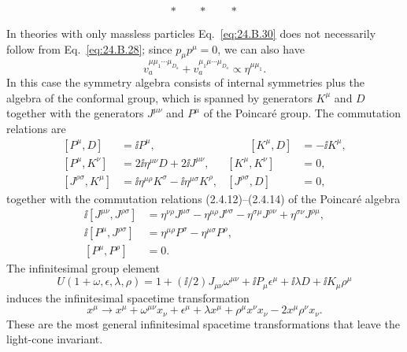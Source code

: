 \[
 *\qquad *\qquad *
\]

In theories with only massless particles Eq.~\eqref{eq:24.B.30} does not
necessarily follow from Eq.~\eqref{eq:24.B.28}; since $p_\mu p^\mu=0$, we can
also have
\begin{equation}
 v_a^{\mu\mu_1\cdots\mu_{D_a}}
 +v_a^{\mu_1\mu\cdots\mu_{D_a}}
 \propto\eta^{\mu\mu_1}.
\tag{24.B.33}\label{eq:24.B.33}
\end{equation}
In this case the symmetry algebra consists of internal symmetries plus the
algebra of the conformal group, which is spanned by generators $K^\mu$ and $D$
together with the generators $J^{\mu\nu}$ and $P^\mu$ of the Poincar\'e group.
The commutation relations are
\begin{equation}
\begin{aligned}
 [P^\mu,D]&=\ii P^\mu,
 &\qquad [K^\mu,D]&=-\ii K^\mu,
 \\
 [P^\mu,K^\nu]&=2\ii\eta^{\mu\nu}D+2\ii J^{\mu\nu},
 & [K^\mu,K^\nu]&=0,
 \\
 [J^{\rho\sigma},K^\mu]
 &=\ii\eta^{\mu\rho}K^\sigma-\ii\eta^{\mu\sigma}K^\rho,
 & [J^{\rho\sigma},D]&=0,
\end{aligned}
\tag{24.B.34}\label{eq:24.B.34}
\end{equation}
together with the commutation relations (2.4.12)--(2.4.14) of the Poincar\'e
algebra
\begin{equation}
\begin{aligned}
 \ii[J^{\mu\nu},J^{\rho\sigma}]
 &=\eta^{\nu\rho}J^{\mu\sigma}
 -\eta^{\mu\rho}J^{\nu\sigma}
 -\eta^{\sigma\mu}J^{\rho\nu}
 +\eta^{\sigma\nu}J^{\rho\mu},
 \\
 \ii[P^\mu,J^{\rho\sigma}]
 &=\eta^{\mu\rho}P^\sigma-\eta^{\mu\sigma}P^\rho,
 \\
 [P^\mu,P^\rho]&=0.
\end{aligned}
\tag{24.B.35}\label{eq:24.B.35}
\end{equation}
The infinitesimal group element
\begin{equation}
 U(1+\omega,\epsilon,\lambda,\rho)
 =1+(\ii/2)J_{\mu\nu}\omega^{\mu\nu}
 +\ii P_\mu\epsilon^\mu+\ii\lambda D+\ii K_\mu\rho^\mu
\tag{24.B.36}\label{eq:24.B.36}
\end{equation}
induces the infinitesimal spacetime transformation
\begin{equation}
 x^\mu\longrightarrow x^\mu+\omega^{\mu\nu}x_\nu+\epsilon^\mu
 +\lambda x^\mu+\rho^\mu x^\nu x_\nu-2x^\mu\rho^\nu x_\nu.
\tag{24.B.37}\label{eq:24.B.37}
\end{equation}
These are the most general infinitesimal spacetime transformations that leave
the light-cone invariant.
